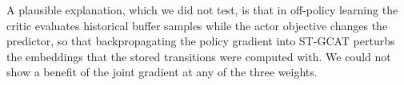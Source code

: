 A plausible explanation, which we did not test, is that in off-policy learning the critic evaluates historical buffer samples while the actor objective changes the predictor, so that backpropagating the policy gradient into ST-GCAT perturbs the embeddings that the stored transitions were computed with. We could not show a benefit of the joint gradient at any of the three weights.

\begin{table}[htbp]
\centering
\caption{Sensitivity to the joint gradient coupling weight $\eta$ (mean $\pm$ standard deviation over seeds; $\eta=0$ corresponds to decoupled training).}
\label{tab:eta}
\small

\end{table}

